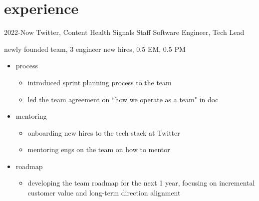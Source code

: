 \documentclass[]{friggeri-cv-a4}
\begin{document}
\section{experience}
\begin{entrylist}
\entry
    {2022-Now}
    {Twitter, Content Health Signals}
    {Staff Software Engineer, Tech Lead}
    {
      newly founded team, 3 engineer new hires, 0.5 EM, 0.5 PM
      \begin{itemize}
      \item process
        \begin{itemize}
        \item introduced sprint planning process to the team
        \item led the team agreement on ``how we operate as a team" in doc
        \end{itemize}
      \item mentoring
        \begin{itemize}
        \item onboarding new hires to the tech stack at Twitter
        \item mentoring engs on the team on how to mentor
        \end{itemize}
      \item roadmap
        \begin{itemize}
        \item developing the team roadmap for the next 1 year, focusing on incremental customer value and long-term direction alignment
        \end{itemize}
      \end{itemize}
    }
\end{entrylist}
\end{document}
